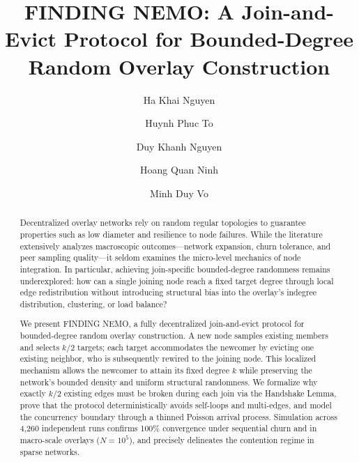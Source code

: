 \documentclass[runningheads]{llncs}
\begin{document}
%
\title{FINDING NEMO: A Join-and-Evict Protocol for Bounded-Degree Random Overlay Construction}
%
%
\author{Ha Khai Nguyen \and
Huynh Phuc To \and
Duy Khanh Nguyen \and
Hoang Quan Ninh \and
Minh Duy Vo}
%
%
%
\maketitle              %
%
\begin{abstract}
Decentralized overlay networks rely on random regular topologies to guarantee properties such as low diameter and resilience to node failures. While the literature extensively analyzes macroscopic outcomes---network expansion, churn tolerance, and peer sampling quality---it seldom examines the micro-level mechanics of node integration. In particular, achieving join-specific bounded-degree randomness remains underexplored: how can a single joining node reach a fixed target degree through local edge redistribution without introducing structural bias into the overlay's indegree distribution, clustering, or load balance?

We present FINDING NEMO, a fully decentralized join-and-evict protocol for bounded-degree random overlay construction. A new node samples existing members and selects $k/2$ targets; each target accommodates the newcomer by evicting one existing neighbor, who is subsequently rewired to the joining node. This localized mechanism allows the newcomer to attain its fixed degree $k$ while preserving the network's bounded density and uniform structural randomness. We formalize why exactly $k/2$ existing edges must be broken during each join via the Handshake Lemma, prove that the protocol deterministically avoids self-loops and multi-edges, and model the concurrency boundary through a thinned Poisson arrival process. Simulation across 4{,}260 independent runs confirms 100\% convergence under sequential churn and in macro-scale overlays ($N = 10^5$), and precisely delineates the contention regime in sparse networks.

\end{abstract}
%
%
%
\end{document}
